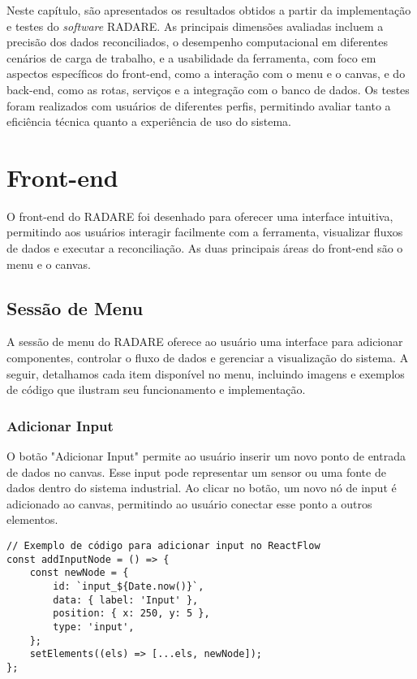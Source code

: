 \label{Cap:Resultados}

Neste capítulo, são apresentados os resultados obtidos a partir da implementação e testes do \textit{software} RADARE. As principais dimensões avaliadas incluem a precisão dos dados reconciliados, o desempenho computacional em diferentes cenários de carga de trabalho, e a usabilidade da ferramenta, com foco em aspectos específicos do front-end, como a interação com o menu e o canvas, e do back-end, como as rotas, serviços e a integração com o banco de dados. Os testes foram realizados com usuários de diferentes perfis, permitindo avaliar tanto a eficiência técnica quanto a experiência de uso do sistema.

\section{Front-end}

O front-end do RADARE foi desenhado para oferecer uma interface intuitiva, permitindo aos usuários interagir facilmente com a ferramenta, visualizar fluxos de dados e executar a reconciliação. As duas principais áreas do front-end são o menu e o canvas.

\subsection{Sessão de Menu}

A sessão de menu do RADARE oferece ao usuário uma interface para adicionar componentes, controlar o fluxo de dados e gerenciar a visualização do sistema. A seguir, detalhamos cada item disponível no menu, incluindo imagens e exemplos de código que ilustram seu funcionamento e implementação.

\subsubsection{Adicionar Input}

O botão "Adicionar Input" permite ao usuário inserir um novo ponto de entrada de dados no canvas. Esse input pode representar um sensor ou uma fonte de dados dentro do sistema industrial. Ao clicar no botão, um novo nó de input é adicionado ao canvas, permitindo ao usuário conectar esse ponto a outros elementos.

\begin{verbatim}
// Exemplo de código para adicionar input no ReactFlow
const addInputNode = () => {
    const newNode = {
        id: `input_${Date.now()}`,
        data: { label: 'Input' },
        position: { x: 250, y: 5 },
        type: 'input',
    };
    setElements((els) => [...els, newNode]);
};
\end{verbatim}

